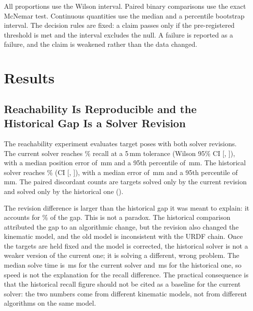 \documentclass[journal]{IEEEtran}
\begin{document}
All proportions use the Wilson interval. Paired binary comparisons use the exact McNemar test. Continuous quantities use the median and a percentile bootstrap interval. The decision rules are fixed: a claim passes only if the pre-registered threshold is met and the interval excludes the null. A failure is reported as a failure, and the claim is weakened rather than the data changed.

\section{Results}
\label{sec:results}

\subsection{Reachability Is Reproducible and the Historical Gap Is a Solver Revision}
The reachability experiment evaluates \reachN{} target poses with both solver revisions. The current solver reaches \reachRecallCurrentPct\% recall at a 5\,mm tolerance (Wilson 95\% CI [\reachRecallCurrentLoPct, \reachRecallCurrentHiPct]), with a median position error of \reachMedianErrCurrentMm\,mm and a 95th percentile of \reachTailErrCurrentMm\,mm. The historical solver reaches \reachRecallOldPct\% (CI [\reachRecallOldLoPct, \reachRecallOldHiPct]), with a median error of \reachMedianErrOldMm\,mm and a 95th percentile of \reachTailErrOldMm\,mm. The paired discordant counts are \reachMcNemarB{} targets solved only by the current revision and \reachMcNemarC{} solved only by the historical one (\reachMcNemarP).

The revision difference is larger than the historical gap it was meant to explain: it accounts for \reachGapExplainedPct\% of the gap. This is not a paradox. The historical comparison attributed the gap to an algorithmic change, but the revision also changed the kinematic model, and the old model is inconsistent with the URDF chain. Once the targets are held fixed and the model is corrected, the historical solver is not a weaker version of the current one; it is solving a different, wrong problem. The median solve time is \reachMedianSolveCurrentMs\,ms for the current solver and \reachMedianSolveOldMs\,ms for the historical one, so speed is not the explanation for the recall difference. The practical consequence is that the historical recall figure should not be cited as a baseline for the current solver: the two numbers come from different kinematic models, not from different algorithms on the same model.
\end{document}
